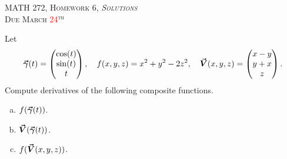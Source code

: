 \documentclass[12pt]{article} %
\begin{document}
\begin{center}
   \textsc{\large MATH 272, Homework 6, \emph{Solutions}}\\
   \textsc{Due March \textcolor{red}{24}$^\textrm{th}$}
\end{center}
\vspace{.5cm}


\begin{problem} 
Let 
\[
\boldsymbol{\vec{\gamma}}(t) = \begin{pmatrix} \cos(t) \\ \sin(t) \\ t \end{pmatrix}, \quad f(x,y,z) = x^2 + y^2 - 2z^2, \quad \boldsymbol{\vec{V}}(x,y,z) = \begin{pmatrix} x-y \\ y+x \\ z \end{pmatrix}.
\]
Compute derivatives of the following composite functions.
\begin{enumerate}[(a)]
	\item $f(\boldsymbol{\vec{\gamma}}(t))$.
	\item $\boldsymbol{\vec{V}}(\boldsymbol{\vec{\gamma}}(t))$.
	\item $f(\boldsymbol{\vec{V}}(x,y,z))$.
\end{enumerate}
\end{problem}
\end{document}
